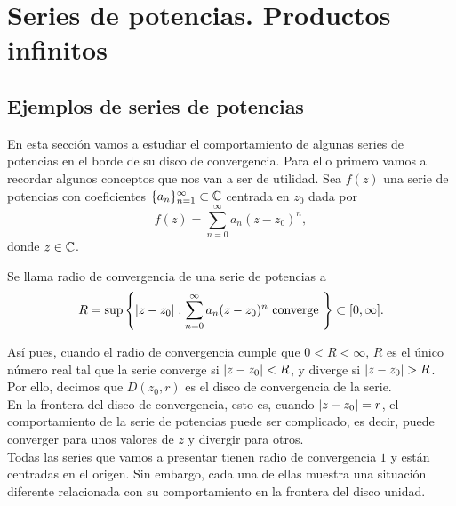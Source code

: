 \chapter{Series de potencias. Productos infinitos}


\section{Ejemplos de series de potencias}
\label{sec:ejemplos}

En esta sección vamos a estudiar el comportamiento de algunas series de potencias en el borde de su disco de convergencia. Para ello primero vamos a recordar algunos conceptos que nos van a ser de utilidad. Sea $f(z)$ una serie de potencias con coeficientes $\{a_n\}_{n=1}^{\infty} \subset \mathbb{C}$ centrada en $z_0$ dada por
\begin{equation*}
    f(z) =  \sum_{n=0}^\infty a_n (z-z_0)^n,
\end{equation*}
donde $z \in \mathbb{C}$. \\

\begin{definition}
    Se llama radio de convergencia de una serie de potencias a
    \begin{equation*}
        R = \sup \left\{ \left\lvert z - z_0\right\rvert : \sum _{n=0}^{\infty} a_n (z - z_0)^n \text{ converge } \right\} \subset [0, \infty].
    \end{equation*}
\end{definition}
\medskip

Así pues, cuando el radio de convergencia cumple que $0 < R < \infty$, $R$ es el único número real tal que la serie converge si $\left\lvert z - z_0\right\rvert < R$, y diverge si $\left\lvert z - z_0\right\rvert > R$. Por ello, decimos que $D(z_0,r)$ es el disco de convergencia de la serie. \\

En la frontera del disco de convergencia, esto es, cuando $\left\lvert z - z_0\right\rvert = r$, el comportamiento de la serie de potencias puede ser complicado, es decir, puede converger para unos valores de $z$ y divergir para otros. \\

Todas las series que vamos a presentar tienen radio de convergencia $1$ y están centradas en el origen. Sin embargo, cada una de ellas muestra una situación diferente relacionada con su comportamiento en la frontera del disco unidad. \\

